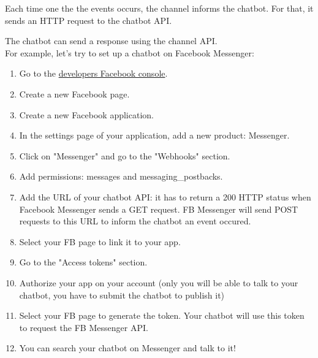 \documentclass{article}
\begin{document}
Each time one the the events occurs, the channel informs the chatbot. For that, it sends an HTTP request to the chatbot API.

The chatbot can send a response using the channel API.\\
\newline
For example, let's try to set up a chatbot on Facebook Messenger:
\begin{enumerate}
    \item Go to the \href{https://developers.facebook.com/}{developers Facebook console}.
    \item Create a new Facebook page.
    \item Create a new Facebook application.
    \item In the settings page of your application, add a new product: Messenger.
    \item Click on "Messenger" and go to the "Webhooks" section.
    \item Add permissions: messages and messaging\_postbacks.
    \item Add the URL of your chatbot API: it has to return a 200 HTTP status when Facebook Messenger sends a GET request. FB Messenger will send POST requests to this URL to inform the chatbot an event occured.
    \item Select your FB page to link it to your app.
    \item Go to the "Access tokens" section.
    \item Authorize your app on your account (only you will be able to talk to your chatbot,  you have to  submit the chatbot to publish it)
    \item Select your FB page to  generate the token. Your chatbot will  use this token to request the FB Messenger API.
    \item You can search your chatbot on Messenger and talk to it!
\end{enumerate}
\newpage
\end{document}
